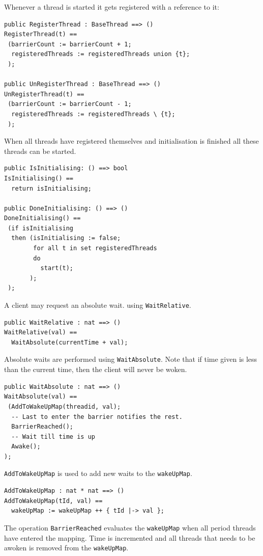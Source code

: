\documentclass{overturerepchap}
\begin{document}
Whenever a thread is started it gets registered with a reference to it:

\begin{lstlisting}
public RegisterThread : BaseThread ==> ()
RegisterThread(t) ==
 (barrierCount := barrierCount + 1;
  registeredThreads := registeredThreads union {t};  
 );
 
public UnRegisterThread : BaseThread ==> ()
UnRegisterThread(t) ==
 (barrierCount := barrierCount - 1;
  registeredThreads := registeredThreads \ {t};
 );
\end{lstlisting}

When all threads have registered themselves and initialisation is finished
all these threads can be started.

\begin{lstlisting}
public IsInitialising: () ==> bool
IsInitialising() ==
  return isInitialising;
 
public DoneInitialising: () ==> ()
DoneInitialising() ==
 (if isInitialising
  then (isInitialising := false;
        for all t in set registeredThreads 
        do
          start(t);
       );
 );
\end{lstlisting}

A client may request an absolute wait. using \texttt{WaitRelative}.

\begin{lstlisting}
public WaitRelative : nat ==> ()
WaitRelative(val) ==
  WaitAbsolute(currentTime + val);
\end{lstlisting}

Absolute waits are performed using \texttt{WaitAbsolute}. Note that if time
given is less than the current time, then the client will never be
woken.

\begin{lstlisting}
public WaitAbsolute : nat ==> ()
WaitAbsolute(val) ==
 (AddToWakeUpMap(threadid, val);
  -- Last to enter the barrier notifies the rest.
  BarrierReached();
  -- Wait till time is up
  Awake();
);
\end{lstlisting}

\texttt{AddToWakeUpMap} is used to add new waits to the \texttt{wakeUpMap}.

\begin{lstlisting}
AddToWakeUpMap : nat * nat ==> ()
AddToWakeUpMap(tId, val) ==
  wakeUpMap := wakeUpMap ++ { tId |-> val };
\end{lstlisting}

The operation \texttt{BarrierReached} evaluates the \texttt{wakeUpMap} when 
all period threads have entered the mapping. Time is incremented and all threads
that needs to be awoken is removed from the \texttt{wakeUpMap}.
\end{document}
